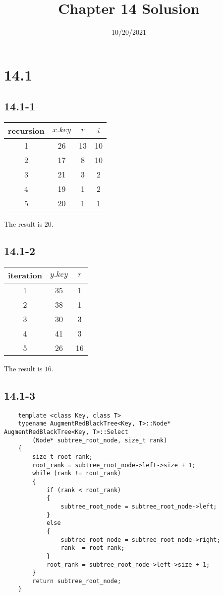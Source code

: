 

\title{Chapter 14 Solusion}
\date{10/20/2021}


\maketitle

\section*{14.1}

\subsection*{14.1-1}

\begin{tabular}{c|c|c|c}
    recursion & $x.key$ & $r$ & $i$\\
    \hline
    1 & 26 & 13 & 10 \\
    2 & 17 & 8 & 10 \\
    3 & 21 & 3 & 2 \\
    4 & 19 & 1 & 2 \\
    5 & 20 & 1 & 1
\end{tabular}

The result is $20$.

\subsection*{14.1-2}

\begin{tabular}{c|c|c}
    iteration & $y.key$ & $r$ \\
    \hline
    1 & 35 & 1 \\
    2 & 38 & 1 \\
    3 & 30 & 3 \\
    4 & 41 & 3 \\
    5 & 26 & 16
\end{tabular}

The result is $16$.

\subsection*{14.1-3}

\begin{verbatim}
    template <class Key, class T>
    typename AugmentRedBlackTree<Key, T>::Node* AugmentRedBlackTree<Key, T>::Select
        (Node* subtree_root_node, size_t rank)
    {
        size_t root_rank;
        root_rank = subtree_root_node->left->size + 1;
        while (rank != root_rank)
        {
            if (rank < root_rank) 
            {
                subtree_root_node = subtree_root_node->left;
            }
            else 
            {
                subtree_root_node = subtree_root_node->right;
                rank -= root_rank;
            }
            root_rank = subtree_root_node->left->size + 1;
        }
        return subtree_root_node;
    } 
\end{verbatim}

